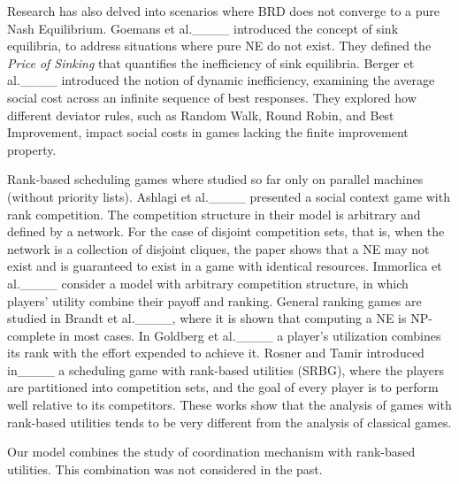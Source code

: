 Research has also delved into scenarios where BRD does not converge to a pure Nash Equilibrium.
Goemans et al.____ introduced the concept of sink equilibria, to address situations where pure NE do not exist. They defined the {\em Price of Sinking} that quantifies the inefficiency of sink equilibria. %
%
Berger et al.____ introduced the notion of dynamic inefficiency, examining the average social cost across an infinite sequence of best responses. They explored how different deviator rules, such as Random Walk, Round Robin, and Best Improvement, impact social costs in games lacking the finite improvement property.


Rank-based scheduling games where studied so far only on parallel machines (without priority lists). Ashlagi et al.____ presented a social context game with rank competition. The competition structure in their model is arbitrary and defined by a network. For the case of disjoint competition sets, that is, when the network is a collection of disjoint cliques, the paper shows that a NE may not exist and is guaranteed to exist in a game with identical resources. Immorlica et al.____ consider a model with arbitrary competition structure, in which players' utility combine their payoff and ranking. General ranking games are studied in Brandt et al.____, where it is shown that computing a NE is NP-complete in most cases. In Goldberg et al.____ a player's utilization combines its rank with the effort expended to achieve it. Rosner and Tamir introduced in____ a scheduling game with rank-based utilities (SRBG), where the players are partitioned into competition sets, and the goal of every player is to perform well relative to its competitors. These works show that the analysis of games with rank-based utilities tends to be very different from the analysis of classical games.

Our model combines the study of coordination mechanism with rank-based utilities. This combination was not considered in the past.

